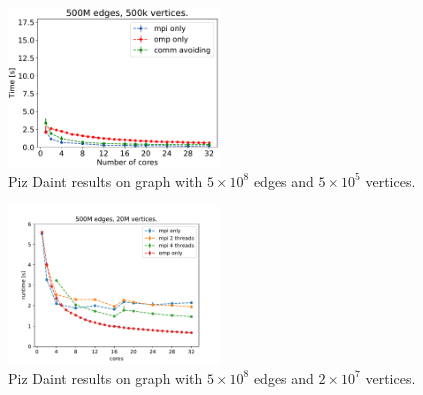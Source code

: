%
%
%



\begin{figure}[H]
\includegraphics[width=0.5\textwidth]{data/plot_vertices_500k}
\caption{Piz Daint results on graph with $5\times10^8$ edges and $5\times10^5$ vertices.}
\label{fig:mpi_omp_commavoiding_daint_1}
\end{figure}

\begin{figure}
\includegraphics[width=0.5\textwidth]{data/plot_vertices_without_commavoid_20M.pdf}
\caption{Piz Daint results on graph with $5\times10^8$ edges and $2\times10^7$ vertices.}
\label{fig:mixed_daint}
\end{figure}

